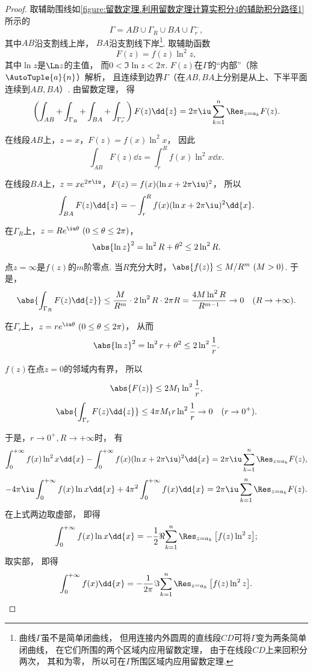 \begin{theorem}
\begin{proof}
取辅助围线如\cref{figure:留数定理.利用留数定理计算实积分4的辅助积分路径1} 所示的\[
	\Gamma = AB \cup \Gamma_R \cup BA \cup \Gamma_r^-,
\]
其中\(AB\)沿支割线上岸，
\(BA\)沿支割线下岸\footnote{曲线\(\Gamma\)虽不是简单闭曲线，
但用连接内外圆周的直线段\(CD\)可将\(\Gamma\)变为两条简单闭曲线，
在它们所围的两个区域内应用留数定理，
由于在线段\(CD\)上来回积分两次，
其和为零，
所以可在\(\Gamma\)所围区域内应用留数定理.}.
取辅助函数\[
	F(z) = f(z) \ln^2 z,
\]
其中\(\ln z\)是\(\Ln z\)的主值，
而\(0<\Im\ln z<2\pi\).
\(F(z)\)在\(\Gamma\)的“内部”（除\(\AutoTuple{a}{n}\)）解析，
且连续到边界\(\Gamma\)（在\(AB,BA\)上分别是从上、下半平面连续到\(AB,BA\)）.
由留数定理，
得\[
	\left(\int_{AB}+\int_{\Gamma_R}+\int_{BA}+\int_{\Gamma_r^-}\right) F(z) \dd{z}
	= 2\pi\iu \sum_{k=1}^n \Res_{z=a_k} F(z).
\]

在线段\(AB\)上，\(z=x\)，\(F(z) = f(x) \ln^2 x\)，
因此\[
	\int_{AB} F(z) \dd{z}
	= \int_r^R f(x) \ln^2 x \dd{x}.
\]

在线段\(BA\)上，\(z = x e^{2\pi\iu}\)，\(F(z) = f(x) (\ln x + 2\pi\iu)^2\)，
所以\[
	\int_{BA} F(z) \dd{z}
	= -\int_r^R f(x) (\ln x + 2\pi\iu)^2 \dd{x}.
\]

在\(\Gamma_R\)上，\(z = R e^{\iu\theta}\ (0\leq\theta\leq2\pi)\)，\[
	\abs{\ln z}^2 = \ln^2 R + \theta^2 \leq 2 \ln^2 R.
\]

点\(z=\infty\)是\(f(z)\)的\(m\)阶零点.
当\(R\)充分大时，\(\abs{f(z)} \leq M/R^m\ (M>0)\).
于是，\[
	\abs{\int_{\Gamma_R} F(z) \dd{z}}
	\leq \frac{M}{R^m} \cdot 2 \ln^2 R \cdot 2\pi R
	= \frac{4M \ln^2 R}{R^{m-1}} \to 0 \quad(R\to+\infty).
\]

在\(\Gamma_r\)上，\(z = r e^{\iu\theta}\ (0\leq\theta\leq2\pi)\)，
从而\[
	\abs{\ln z}^2 = \ln^2 r + \theta^2
	\leq 2 \ln^2 \frac{1}{r}.
\]

\(f(z)\)在点\(z=0\)的邻域内有界，
所以\[
	\abs{F(z)} \leq 2M_1 \ln^2 \frac{1}{r},
\]\[
	\abs{\int_{\Gamma_r} F(z) \dd{z}}
	\leq 4\pi M_1 r \ln^2 \frac{1}{r}
	\to 0 \quad(r\to0^+).
\]

于是，\(r\to0^+, R\to+\infty\)时，
有\[
	\int_0^{+\infty} f(x) \ln^2 x \dd{x}
	- \int_0^{+\infty} f(x) (\ln x + 2\pi\iu)^2 \dd{x}
	= 2\pi\iu \sum_{k=1}^n \Res_{z=a_k} F(z),
\]\[
	-4\pi\iu \int_0^{+\infty} f(x) \ln x \dd{x}
	+ 4\pi^2 \int_0^{+\infty} f(x) \dd{x}
	= 2\pi\iu \sum_{k=1}^n \Res_{z=a_k} F(z).
\]
在上式两边取虚部，
即得\begin{equation}\label{equation:留数定理.利用留数定理计算实积分4.2}
	\int_0^{+\infty} f(x) \ln x \dd{x}
	= -\frac{1}{2} \Re{ \sum_{k=1}^n \Res_{z=a_k} \left[ f(z) \ln^2 z \right] };
\end{equation}
取实部，
即得\begin{equation}\label{equation:留数定理.利用留数定理计算实积分4.3}
	\int_0^{+\infty} f(x) \dd{x}
	= -\frac{1}{2\pi} \Im{ \sum_{k=1}^n \Res_{z=a_k} \left[ f(z) \ln^2 z \right] }.
\end{equation}
\end{proof}
\end{theorem}

